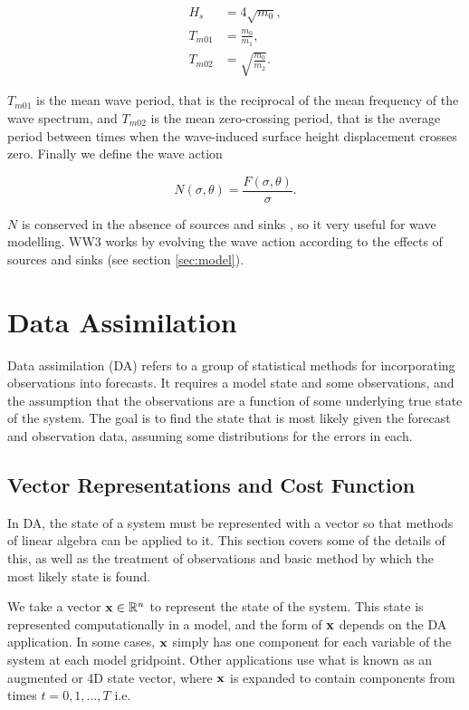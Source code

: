 \begin{align}
H_s &= 4\sqrt{m_0}, \\
T_{m01} &= \frac{m_0}{m_1}, \\
T_{m02} &= \sqrt{\frac{m_0}{m_2}}.
\label{eqn:mainvars}
\end{align}

$T_{m01}$ is the mean wave period, that is the reciprocal of the mean frequency of the wave spectrum, and $T_{m02}$ is the mean zero-crossing period, that is the average period between times when the wave-induced surface height displacement crosses zero. Finally we define the wave action

\begin{equation}
N(\sigma,\theta) = \frac {F(\sigma,\theta)} {\sigma}.
\label{eqn:waveaction}
\end{equation}

$N$ is conserved in the absence of sources and sinks \citep{Bretherton1968}, so it very useful for wave modelling. WW3 works by evolving the wave action according to the effects of sources and sinks (see section \ref{sec:model}).

\section{Data Assimilation}

Data assimilation (DA) refers to a group of statistical methods for incorporating observations into forecasts. It requires a model state and some observations, and the assumption that the observations are a function of some underlying true state of the system. The goal is to find the state that is most likely given the forecast and observation data, assuming some distributions for the errors in each.

\subsection{Vector Representations and Cost Function}
\label{sec:DAintro}

In DA, the state of a system must be represented with a vector so that methods of linear algebra can be applied to it. This section covers some of the details of this, as well as the treatment of observations and basic method by which the most likely state is found.

We take a vector $\mathbf{x} \in \mathbb{R}^n$ to represent the state of the system. This state is represented computationally in a model, and the form of $\mathbf{x}$ depends on the DA application. In some cases, $\mathbf{x}$ simply has one component for each variable of the system at each model gridpoint. Other applications use what is known as an augmented or 4D state vector, where $\mathbf{x}$ is expanded to contain components from times $t = 0,1,\dots,T$ i.e.

